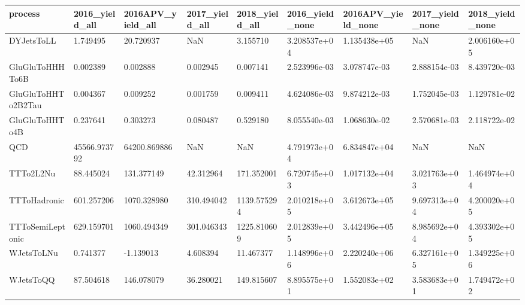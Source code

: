 \begin{tabular}{lllllllll}
\toprule
           process & 2016\_yield\_all & 2016APV\_yield\_all & 2017\_yield\_all & 2018\_yield\_all & 2016\_yield\_none & 2016APV\_yield\_none & 2017\_yield\_none & 2018\_yield\_none \\
\midrule
        DYJetsToLL &       1.749495 &         20.720937 &            NaN &       3.155710 &    3.208537e+04 &       1.135438e+05 &             NaN &    2.006160e+05 \\
   GluGluToHHHTo6B &       0.002389 &          0.002888 &       0.002945 &       0.007141 &    2.523996e-03 &       3.078747e-03 &    2.888154e-03 &    8.439720e-03 \\
GluGluToHHTo2B2Tau &       0.004367 &          0.009252 &       0.001759 &       0.009411 &    4.624086e-03 &       9.874212e-03 &    1.752045e-03 &    1.129781e-02 \\
    GluGluToHHTo4B &       0.237641 &          0.303273 &       0.080487 &       0.529180 &    8.055540e-03 &       1.068630e-02 &    2.570681e-03 &    2.118722e-02 \\
               QCD &   45566.973792 &      64200.869886 &            NaN &            NaN &    4.791973e+04 &       6.834847e+04 &             NaN &             NaN \\
         TTTo2L2Nu &      88.445024 &        131.377149 &      42.312964 &     171.352001 &    6.720745e+03 &       1.017132e+04 &    3.021763e+03 &    1.464974e+04 \\
      TTToHadronic &     601.257206 &       1070.328980 &     310.494042 &    1139.575294 &    2.010218e+05 &       3.612673e+05 &    9.697313e+04 &    4.200020e+05 \\
  TTToSemiLeptonic &     629.159701 &       1060.494349 &     301.046343 &    1225.810609 &    2.012839e+05 &       3.442496e+05 &    8.985692e+04 &    4.393302e+05 \\
        WJetsToLNu &       0.741377 &         -1.139013 &       4.608394 &      11.467377 &    1.148996e+06 &       2.220240e+06 &    6.327161e+05 &    1.349225e+06 \\
         WJetsToQQ &      87.504618 &        146.078079 &      36.280021 &     149.815607 &    8.895575e+01 &       1.552083e+02 &    3.583683e+01 &    1.749472e+02 \\
\bottomrule
\end{tabular}

